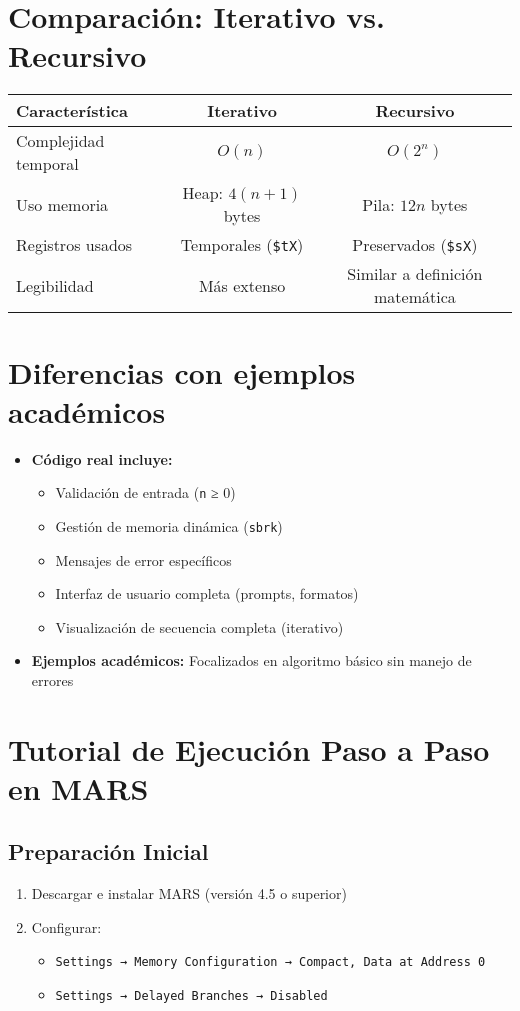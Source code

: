 \documentclass[a4paper, 12pt]{article}
\begin{document}
\section{Comparación: Iterativo vs. Recursivo}
\begin{table}[h]
    \centering
    \begin{tabular}{|l|c|c|}
        \hline
        \textbf{Característica} & \textbf{Iterativo} & \textbf{Recursivo} \\
        \hline
        Complejidad temporal & $O(n)$ & $O(2^n)$ \\
        \hline
        Uso memoria & Heap: $4(n+1)$ bytes & Pila: $12n$ bytes \\
        \hline
        Registros usados & Temporales (\texttt{\$tX}) & Preservados (\texttt{\$sX}) \\
        \hline
        Legibilidad & Más extenso & Similar a definición matemática \\
        \hline
    \end{tabular}
\end{table}

\section{Diferencias con ejemplos académicos}
\begin{itemize}
    \item \textbf{Código real incluye:}
    \begin{itemize}
        \item Validación de entrada (\texttt{n} ≥ 0)
        \item Gestión de memoria dinámica (\texttt{sbrk})
        \item Mensajes de error específicos
        \item Interfaz de usuario completa (prompts, formatos)
        \item Visualización de secuencia completa (iterativo)
    \end{itemize}
    \item \textbf{Ejemplos académicos:} Focalizados en algoritmo básico sin manejo de errores
\end{itemize}

\section{Tutorial de Ejecución Paso a Paso en MARS}
\subsection{Preparación Inicial}
\begin{enumerate}
    \item Descargar e instalar MARS (versión 4.5 o superior)
    \item Configurar:
    \begin{itemize}
        \item \texttt{Settings → Memory Configuration → Compact, Data at Address 0}
        \item \texttt{Settings → Delayed Branches → Disabled}
    \end{itemize}
\end{enumerate}
\end{document}

